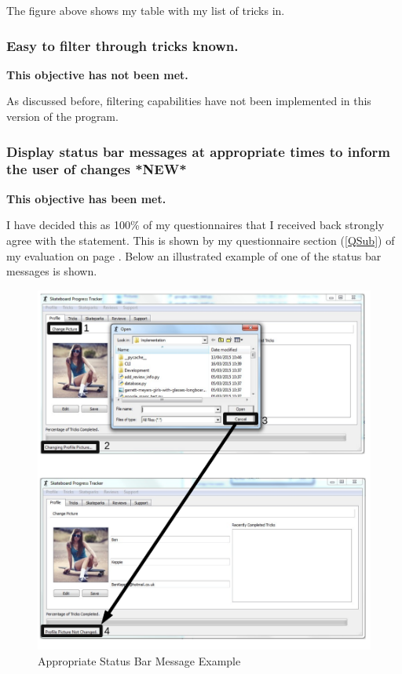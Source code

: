 The figure above shows my table with my list of tricks in.







\subsubsection{ Easy to filter through tricks known.}

\textbf{This objective has not been met.}

As discussed before, filtering capabilities have not been implemented in this version of the program.



\subsubsection {Display status bar messages at appropriate times to inform the user of changes *NEW*} 

\textbf{This objective has been met.}

I have decided this as 100\% of my questionnaires that I received back strongly agree with the statement. This is shown by my questionnaire section (\ref{QSub}) of my evaluation on page \pageref{QSub}. Below an illustrated example of one of the status bar messages is shown.

\begin{figure}[H]
    \includegraphics[width=\textwidth]{./Evaluation/images/StatusBarEvidence.pdf}
    \caption{Appropriate Status Bar Message Example} \label{fig:StatusBarEvidence}
\end{figure}

